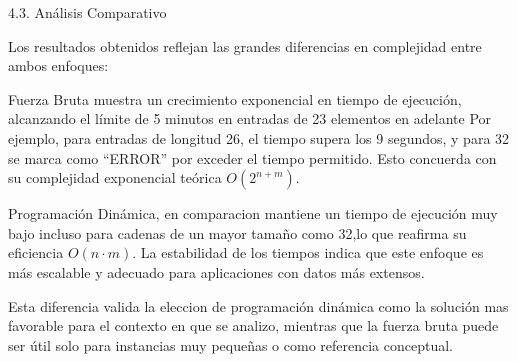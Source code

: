 4.3. Análisis Comparativo

Los resultados obtenidos reflejan las grandes diferencias en complejidad entre ambos enfoques:

    Fuerza Bruta muestra un crecimiento exponencial en tiempo de ejecución, 
    alcanzando el límite de 5 minutos en entradas de 23 elementos en adelante Por ejemplo, para entradas de longitud 26, el tiempo supera los 9 segundos, y para 32 se marca como “ERROR” por exceder el tiempo permitido. Esto concuerda con su complejidad exponencial teórica $O(2^{n + m})$.


    Programación Dinámica, en comparacion mantiene un tiempo de ejecución muy bajo 
    incluso para cadenas de un mayor tamaño como 32,lo que reafirma su eficiencia $O(n \cdot m)$. La estabilidad de los tiempos 
    indica que este enfoque es más escalable y adecuado para aplicaciones con datos más 
    extensos.

Esta diferencia valida la eleccion de programación dinámica como la solución mas favorable para el contexto en que se analizo, mientras que la fuerza bruta puede ser útil solo para 
instancias muy pequeñas o como referencia conceptual.